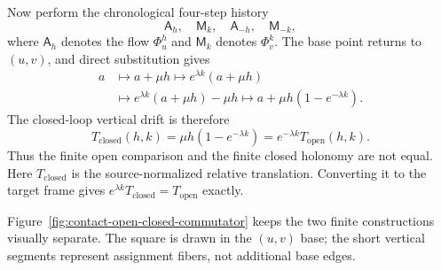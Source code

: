 Now perform the chronological four-step history
\[
    \mathsf A_h,\quad \mathsf M_k,\quad
    \mathsf A_{-h},\quad \mathsf M_{-k},
\]
where \(\mathsf A_h\) denotes the flow \(\Phi_u^h\) and
\(\mathsf M_k\) denotes \(\Phi_v^k\).  The base point returns to \((u,v)\),
and direct substitution gives
\begin{align*}
    a&\longmapsto a+\mu h
      \longmapsto e^{\lambda k}(a+\mu h)\\
     &\longmapsto e^{\lambda k}(a+\mu h)-\mu h
      \longmapsto a+\mu h(1-e^{-\lambda k}).
\end{align*}
The closed-loop vertical drift is therefore
\begin{equation}
    T_{\mathrm{closed}}(h,k)
       =\mu h(1-e^{-\lambda k})
       =e^{-\lambda k}T_{\mathrm{open}}(h,k).
    \label{eq:exact-closed-contact-drift}
\end{equation}
Thus the finite open comparison and the finite closed holonomy are not equal.
Here \(T_{\mathrm{closed}}\) is the source-normalized relative translation.
Converting it to the target frame gives
\(e^{\lambda k}T_{\mathrm{closed}}=T_{\mathrm{open}}\) exactly.

Figure~\ref{fig:contact-open-closed-commutator} keeps the two finite
constructions visually separate.  The square is drawn in the $(u,v)$ base;
the short vertical segments represent assignment fibers, not additional base
edges.

